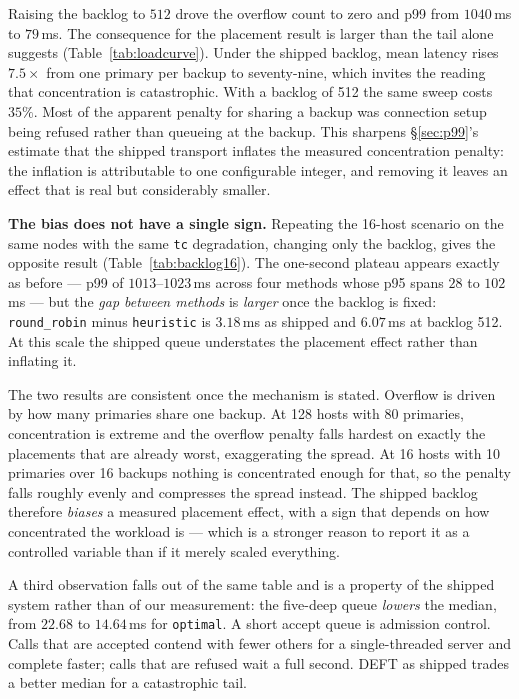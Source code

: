 Raising the backlog to $512$ drove the overflow count to zero and p99 from
$1040$\,ms to $79$\,ms. The consequence for the placement result is larger than
the tail alone suggests (Table~\ref{tab:loadcurve}). Under the shipped backlog,
mean latency rises $7.5\times$ from one primary per backup to seventy-nine,
which invites the reading that concentration is catastrophic. With a backlog of
512 the same sweep costs $35\%$. Most of the apparent penalty for sharing a
backup was connection setup being refused rather than queueing at the backup.
This sharpens \S\ref{sec:p99}'s estimate that the shipped transport inflates the
measured concentration penalty: the inflation is attributable to one
configurable integer, and removing it leaves an effect that is real but
considerably smaller.

\textbf{The bias does not have a single sign.} Repeating the 16-host scenario on
the same nodes with the same \texttt{tc} degradation, changing only the backlog,
gives the opposite result (Table~\ref{tab:backlog16}). The one-second plateau
appears exactly as before --- p99 of $1013$--$1023$\,ms across four methods whose
p95 spans $28$ to $102$\,ms --- but the \emph{gap between methods} is
\emph{larger} once the backlog is fixed: \texttt{round\_robin} minus
\texttt{heuristic} is $3.18$\,ms as shipped and $6.07$\,ms at backlog 512. At
this scale the shipped queue understates the placement effect rather than
inflating it.

The two results are consistent once the mechanism is stated. Overflow is driven
by how many primaries share one backup. At 128 hosts with 80 primaries,
concentration is extreme and the overflow penalty falls hardest on exactly the
placements that are already worst, exaggerating the spread. At 16 hosts with 10
primaries over 16 backups nothing is concentrated enough for that, so the
penalty falls roughly evenly and compresses the spread instead. The shipped
backlog therefore \emph{biases} a measured placement effect, with a sign that
depends on how concentrated the workload is --- which is a stronger reason to
report it as a controlled variable than if it merely scaled everything.

A third observation falls out of the same table and is a property of the shipped
system rather than of our measurement: the five-deep queue \emph{lowers} the
median, from $22.68$ to $14.64$\,ms for \texttt{optimal}. A short accept queue is
admission control. Calls that are accepted contend with fewer others for a
single-threaded server and complete faster; calls that are refused wait a full
second. DEFT as shipped trades a better median for a catastrophic tail.

